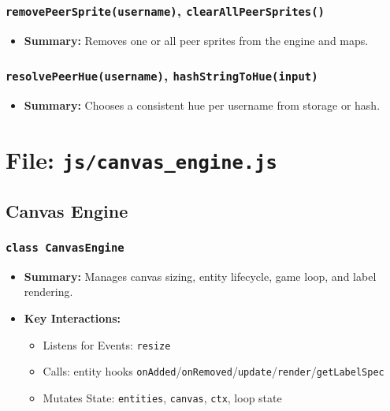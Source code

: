 \documentclass[11pt,letterpaper]{article}
\begin{document}
\subsubsection{\texttt{removePeerSprite(username)}, \texttt{clearAllPeerSprites()}}
\begin{itemize}
    \item \textbf{Summary:} Removes one or all peer sprites from the engine and maps.
\end{itemize}

\subsubsection{\texttt{resolvePeerHue(username)}, \texttt{hashStringToHue(input)}}
\begin{itemize}
    \item \textbf{Summary:} Chooses a consistent hue per username from storage or hash.
\end{itemize}

\section{File: \texttt{js/canvas\_engine.js}}

\subsection{Canvas Engine}

\subsubsection{\texttt{class CanvasEngine}}
\begin{itemize}
    \item \textbf{Summary:} Manages canvas sizing, entity lifecycle, game loop, and label rendering.
    \item \textbf{Key Interactions:}
    \begin{itemize}
        \item Listens for Events: \texttt{resize}
        \item Calls: entity hooks \texttt{onAdded}/\texttt{onRemoved}/\texttt{update}/\texttt{render}/\texttt{getLabelSpec}
        \item Mutates State: \texttt{entities}, \texttt{canvas}, \texttt{ctx}, loop state
    \end{itemize}
\end{itemize}
\end{document}
